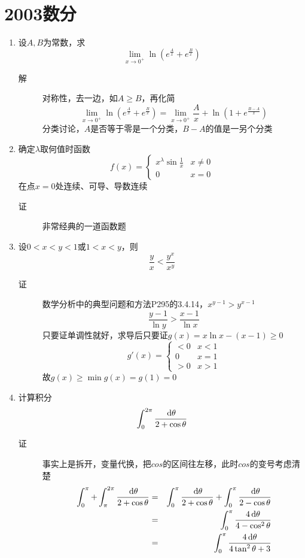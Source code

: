 \section{2003数分}
\begin{enumerate}

\item 设$A,B$为常数，求
\[
\lim_{x \to 0^+}\ln(e^{\frac{A}{x}}+e^{\frac{B}{x}})
\]
\begin{description}
\item[解] 对称性，去一边，如$A\geq B$，再化简
\[
\lim_{x \to 0^+}\ln(e^{\frac{A}{x}}+e^{\frac{B}{x}}) = \lim_{x \to 0^+}\frac{A}{x}+\ln(1+e^\frac{B-A}{x})
\]
分类讨论，$A$是否等于零是一个分类，$B-A$的值是一另个分类
\end{description}

\item 确定$\lambda$取何值时函数
\[
f(x) = \begin{cases}
x^{\lambda}\sin\frac{1}{x} & x\neq 0\\
0 & x=0
\end{cases}
\]
在点$x=0$处连续、可导、导数连续
\begin{description}
\item[证] 非常经典的一道函数题
\end{description}

\item 设$0<x<y<1$或$1<x<y$，则
\[
\frac{y}{x}< \frac{y^x}{x^y}
\]
\begin{description}
\item[证] 数学分析中的典型问题和方法P295的3.4.14，$x^{y-1}>y^{x-1}$
\[
\frac{y-1}{\ln y}>\frac{x-1}{\ln x}
\]
只要证单调性就好，求导后只要证$g(x)=x\ln x-(x-1)\geq0$
\[
g'(x) = \begin{cases}
<0 & x<1\\
0 & x=1\\
>0 & x>1
\end{cases}
\]
故$g(x)\geq \min g(x)=g(1)=0$
\end{description}

\item 计算积分
\[
\int_0^{2\pi} \frac{\,\mathrm{d} \theta}{2+\cos \theta}
\]
\begin{description}
\item[证] 事实上是拆开，变量代换，把$cos$的区间往左移，此时$cos$的变号考虑清楚
\begin{eqnarray*}
\int_0^{\pi}+\int_{\pi}^{2\pi} \frac{\,\mathrm{d} \theta}{2+\cos \theta}&=& \int_0^{\pi} \frac{\,\mathrm{d} \theta}{2+\cos \theta}+\int_0^{\pi} \frac{\,\mathrm{d} \theta}{2-\cos\theta}\\
&=& \int_0^{\pi} \frac{4\,\mathrm{d} \theta}{4-\cos^2 \theta}\\
&=& \int_0^{\pi} \frac{4\,\mathrm{d} \theta}{4\tan^2\theta+3}\\
\end{eqnarray*}
\end{description}


\end{enumerate}
